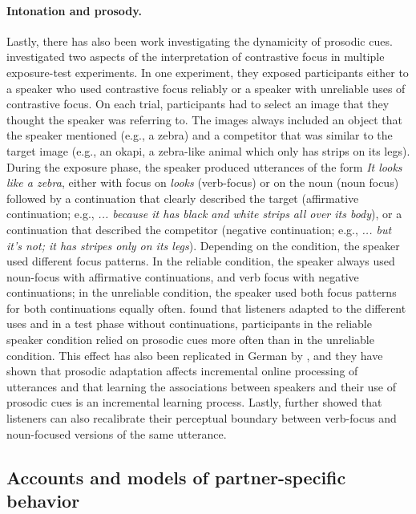 \paragraph{Intonation and prosody.} Lastly, there has also been work investigating the dynamicity of prosodic cues. 
\cite{Kurumada2012} investigated two aspects of the interpretation of contrastive focus in multiple exposure-test experiments. 
In one experiment, they exposed participants either to a speaker who used contrastive focus reliably or a speaker with unreliable
uses of contrastive focus. On each trial, participants had to select an image that they thought the speaker was referring to. The images
always included an object that the speaker mentioned (e.g., a zebra) and a competitor that was similar to the target image (e.g., an okapi,
a zebra-like animal which only has strips on its legs). During the exposure phase, the speaker produced utterances of the form \textit{It looks like a zebra}, either
with focus on \textit{looks} (verb-focus) or on the noun (noun focus) followed by a continuation that clearly described the target (affirmative continuation; e.g., \textit{... because it has black and white strips all over its body}),
or a continuation that described the competitor (negative continuation; e.g., \textit{... but it's not; it has stripes only on its legs}). Depending on the condition, 
the speaker used different focus patterns. In the reliable condition, the speaker always used noun-focus with affirmative continuations, and verb focus with
negative continuations; in the unreliable condition, the speaker used both focus patterns for both continuations equally often. \cite{Kurumada2012} found
that listeners adapted to the different uses and in a test phase without continuations, participants in the reliable speaker condition relied on prosodic cues more
often than in the unreliable condition. This effect has also been replicated in German by \cite{RoettgerFranke2019}, and they have shown that prosodic adaptation
affects incremental online processing of utterances and that learning the associations between speakers and their use of prosodic cues is an incremental learning process.
Lastly, \cite{Kurumada2012} further showed that listeners can also recalibrate their perceptual boundary between verb-focus and noun-focused
versions of the same utterance.

\subsection{Accounts and models of partner-specific behavior}

